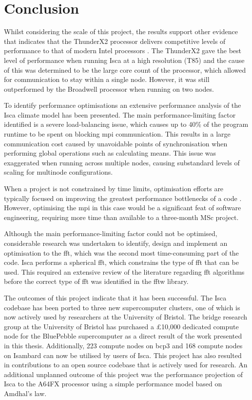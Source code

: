 \documentclass[a4paper,11pt]{report}
\begin{document}
\section{Conclusion}
Whilst considering the scale of this project, the results support other evidence that indicates that the ThunderX2 processor delivers competitive levels of performance to that of modern Intel processors \cite{mcintosh2018performance}. The ThunderX2 gave the best level of performance when running Isca at a high resolution (T85) and the cause of this was determined to be the large core count of the processor, which allowed for communication to stay within a single node. However, it was still outperformed by the Broadwell processor when running on two nodes. 
\par
To identify performance optimisations an extensive performance analysis of the Isca climate model has been presented. The main performance-limiting factor identified is a severe load-balancing issue, which causes up to 40\% of the program runtime to be spent on blocking \gls{mpi} communication. This results in a large communication cost caused by unavoidable points of synchronisation when performing global operations such as calculating means. This issue was exaggerated when running across multiple nodes, causing substandard levels of scaling for multinode configurations. 
\par
When a project is not constrained by time limits, optimisation efforts are typically focused on improving the greatest performance bottlenecks of a code \cite{asanovic2006landscape}. However, optimising the \gls{mpi} in this case would be a significant feat of software engineering, requiring more time than available to a three-month MSc project.
\par
Although the main performance-limiting factor could not be optimised, considerable research was undertaken to identify, design and implement an optimisation to the \gls{fft}, which was the second most time-consuming part of the code. Isca performs a spherical \gls{fft}, which constrains the type of \gls{fft} that can be used. This required an extensive review of the literature regarding \gls{fft} algorithms before the correct type of \gls{fft} was identified in the \gls{fftw} library.
\par
The outcomes of this project indicate that it has been successful. The Isca codebase has been ported to three new supercomputer clusters, one of which is now actively used by researchers at the University of Bristol. The \gls{bridge} research group at the University of Bristol has purchased a £10,000 dedicated compute node for the BluePebble supercomputer as a direct result of the work presented in this thesis. Additionally, 223 compute nodes on \gls{bcp3} and 168 compute nodes on Isambard can now be utilised by users of Isca. This project has also resulted in contributions to an open source codebase that is actively used for research. An additional unplanned outcome of this project was the performance projection of Isca to the A64FX processor using a simple performance model based on Amdhal's law.
\end{document}
